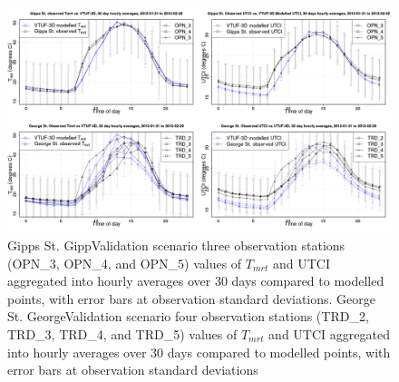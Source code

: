 \documentclass[final,3p,times,authoryear]{elsarticle}
\begin{document}
\begin{figure}[!htbp]
\includegraphics[trim = 0mm 0mm 0mm 0mm, clip, scale=0.32]{images/GippsValidation-TmrtUtci4Panes8.png}
\caption{Gipps St. GippValidation scenario three observation stations (OPN\_3, OPN\_4, and OPN\_5) values of $T_{mrt}$ and UTCI aggregated into hourly averages over 30 days compared to modelled points, with error bars at observation standard deviations. George St. GeorgeValidation scenario four observation stations (TRD\_2, TRD\_3, TRD\_4, and TRD\_5) values of $T_{mrt}$ and UTCI aggregated into hourly averages over 30 days compared to modelled points, with error bars at observation standard deviations \label{fig:GippsSt30Compare}\label{fig:GippsStUTCI30Compare}\label{fig:GeorgeSt30Compare}}
\end{figure} 
 
 
\end{document}
